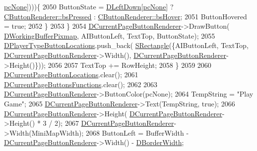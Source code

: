 \begin{DoxyCode}
      \hyperlink{GameDataTypes_8h_aafb0ca75933357ff28a6d7efbdd7602fa88767aa8e02c7b3192bbab4127b3d729}{pcNone}])))\{
2050                 ButtonState = \hyperlink{classCApplicationData_a2b943f18557c3e4c8cd4550e22e028b6}{DLeftDown}[\hyperlink{GameDataTypes_8h_aafb0ca75933357ff28a6d7efbdd7602fa88767aa8e02c7b3192bbab4127b3d729}{pcNone}] ? 
      \hyperlink{classCButtonRenderer_ae0eccda184600f6e14bfd59033e5e9a1a8fad69630f3700a97a0c51bcbb4441b5}{CButtonRenderer::bsPressed} : \hyperlink{classCButtonRenderer_ae0eccda184600f6e14bfd59033e5e9a1ad6758a415bde0eee152a0e2f7d07e3b6}{CButtonRenderer::bsHover};
2051                 ButtonHovered = \textcolor{keyword}{true};
2052             \}
2053         \}
2054         \hyperlink{classCApplicationData_abfe1743f2634b069ccc811db4a8733a8}{DCurrentPageButtonRenderer}->DrawButton(
      \hyperlink{classCApplicationData_afa34cf2780f38dd28c0c811e69d60a97}{DWorkingBufferPixmap}, AIButtonLeft, TextTop, ButtonState);
2055         \hyperlink{classCApplicationData_a49d2ad6ab469e18577716ac993b475cb}{DPlayerTypeButtonLocations}.push\_back(
      \hyperlink{structSRectangle}{SRectangle}(\{AIButtonLeft, TextTop, \hyperlink{classCApplicationData_abfe1743f2634b069ccc811db4a8733a8}{DCurrentPageButtonRenderer}->Width(),
       \hyperlink{classCApplicationData_abfe1743f2634b069ccc811db4a8733a8}{DCurrentPageButtonRenderer}->Height()\}));
2056                 
2057         TextTop += RowHeight;
2058     \}
2059     
2060     \hyperlink{classCApplicationData_a3615df8e23cea3ce17f11cf61340a7b4}{DCurrentPageButtonLocations}.clear();
2061     \hyperlink{classCApplicationData_ad3079e5563a19d21c1e4ceff2a188382}{DCurrentPageButtonsFunctions}.clear();
2062     
2063     \hyperlink{classCApplicationData_abfe1743f2634b069ccc811db4a8733a8}{DCurrentPageButtonRenderer}->ButtonColor(pcNone);
2064     TempString = \textcolor{stringliteral}{"Play Game"};
2065     \hyperlink{classCApplicationData_abfe1743f2634b069ccc811db4a8733a8}{DCurrentPageButtonRenderer}->Text(TempString, \textcolor{keyword}{true});   
2066     \hyperlink{classCApplicationData_abfe1743f2634b069ccc811db4a8733a8}{DCurrentPageButtonRenderer}->Height(
      \hyperlink{classCApplicationData_abfe1743f2634b069ccc811db4a8733a8}{DCurrentPageButtonRenderer}->Height() * 3 / 2);
2067     \hyperlink{classCApplicationData_abfe1743f2634b069ccc811db4a8733a8}{DCurrentPageButtonRenderer}->Width(MiniMapWidth);
2068     ButtonLeft = BufferWidth - \hyperlink{classCApplicationData_abfe1743f2634b069ccc811db4a8733a8}{DCurrentPageButtonRenderer}->Width() - 
      \hyperlink{classCApplicationData_a566b69c72fa982c6ecf8e47dc21df489}{DBorderWidth};

\end{DoxyCode}
